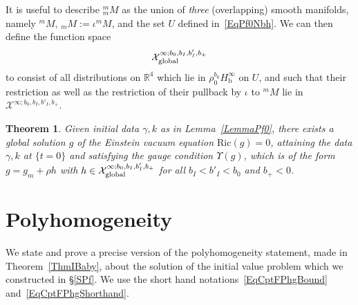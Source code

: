 \documentclass[reqno,11pt,letterpaper]{amsart}
\numberwithin{equation}{section}
\numberwithin{figure}{section}
\newtheorem{thm}{Theorem}[section]
\theoremstyle{definition}
\theoremstyle{remark}
\newcommand{\mc}{\mathcal}
\newcommand{\cX}{\mc X}
\newcommand{\R}{\mathbb{R}}
\newcommand{\Ups}{\Upsilon}
\newcommand{\bop}{{\mathrm{b}}}
\newcommand{\Hb}{H_{\bop}}
\newcommand{\Ric}{\mathrm{Ric}}
\newcommand{\usref}[1]{{\upshape\ref{#1}}}
\begin{document}
It is useful to describe ${}^m_m\!M$ as the union of \emph{three} (overlapping) smooth manifolds, namely ${}^m\!M$, ${}_m M:=\iota{}^m\!M$, and the set $U$ defined in~\eqref{EqPf0Nbh}. We can then define the function space
\[
  \cX^{\infty;b_0,b_I,b'_I,b_+}_{\rm global}
\]
to consist of all distributions on $\R^4$ which lie in $\rho_0^{b_0}\Hb^\infty$ on $U$, and such that their restriction as well as the restriction of their pullback by $\iota$ to ${}^m\!M$ lie in $\cX^{\infty;b_0,b_I,b'_I,b_+}$.

\begin{thm}
\label{ThmPfGlobal}
  Given initial data $\gamma,k$ as in Lemma~\usref{LemmaPf0}, there exists a global solution $g$ of the Einstein vacuum equation $\Ric(g)=0$, attaining the data $\gamma,k$ at $\{t=0\}$ and satisfying the gauge condition $\Ups(g)$, which is of the form $g=g_m+\rho h$ with $h\in\cX^{\infty;b_0,b_I,b'_I,b_+}_{\rm global}$ for all $b_I<b'_I<b_0$ and $b_+<0$.
\end{thm}



\section{Polyhomogeneity}
\label{SPhg}

We state and prove a precise version of the polyhomogeneity statement, made in Theorem~\ref{ThmIBaby}, about the solution of the initial value problem which we constructed in \S\ref{SPf}. We use the short hand notations~\eqref{EqCptFPhgBound} and~\eqref{EqCptFPhgShorthand}.
\end{document}
